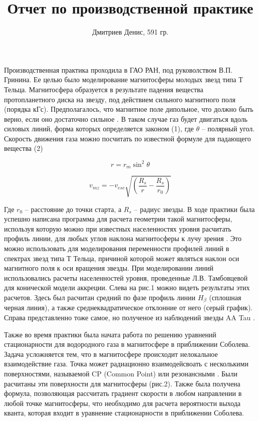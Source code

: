 \documentclass{article}
\begin{document}
\title{Отчет по производственной практике}
\author{Дмитриев Денис, 591 гр.}
\maketitle

Производственная практика проходила в ГАО РАН, под руковолством В.П. Гринина. Ее целью было моделирование магнитосферы молодых звезд типа Т Тельца. Магнитосфера образуется в результате падения вещества протопланетного диска на звезду, под действием сильного магнитного поля (порядка кГс). Предполагалось, что магнитное поле дипольное, что должно быть верно, если оно достаточно сильное \cite{hartmann94}. В таком случае газ будет двигаться вдоль силовых линий, форма которых определяется законом (1), где $\theta$ -- полярный угол. Скорость движения газа можно посчитать по известной формуле для падающего вещества (2)

\begin{equation}
r = r_m \sin^2 \theta
\end{equation}

\begin{equation}
v_{mz} = -v_{esc}\sqrt{\left(\frac{R_s}{r} - \frac{R_s}{r_0}\right)}
\end{equation}

Где $r_0$ -- расстояние до точки старта, а $R_s$ -- радиус звезды.
В ходе практики была успешно написана программа для расчета геометрии такой магнитосферы, используя которую можно при известных населенностях уровня расчитать профиль линии, для любых углов наклона магнитосферы к лучу зрения \cite{petrov01}. Это можно использовать для моделирования переменности профилей линий в спектрах звезд типа Т Тельца, причиной которой может являться наклон оси магнитного поля к оси вращения звезды. При моделировании линий использовались расчеты населенностей уровня, проведенные Л.В. Тамбовцевой для конической модели аккреции. Слева на рис.1 можно видеть результаты этих расчетов. Здесь был расчитан средний по фазе профиль линии $H_\beta$ (сплошная черная линия), а также среднеквадратическое отклонние от него (серый график). Справа представленно тоже самое, но полученое из наблюдений звезды AA Tau \cite{bouvier07}. 


Также во время практики была начата работа по решению уравнений стационарности для водородного газа в магнитосфере в приближении Соболева. Задача усложняется тем, что в магнитосфере происходит нелокальное взаимодействие газа. Точка может радиационно взаимодейсвоать с несколькими поверхностями, называемой CP (Common Point) или резонансными \cite{grachev75}. Были расчитаны эти поверхности для магнитосферы (рис.2). Также была получена формула, позволяющая рассчитать градиент скорости в любом направлении в любой точке магнитосферы, что необходимо для расчета вероятности выхода кванта, которая входит в уравнение стационарности в приближении Соболева. 
\end{document}
